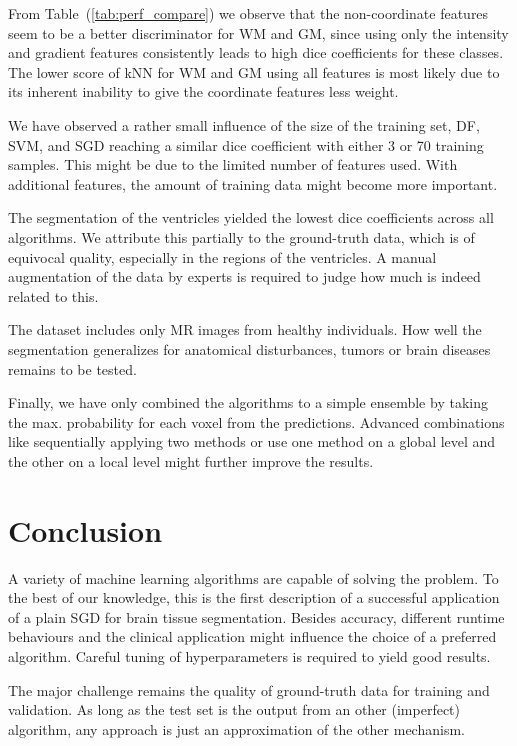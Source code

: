 \documentclass[journal]{IEEEtran}
\begin{document}
From Table~(\ref{tab:perf_compare}) we observe that the non-coordinate features seem to be a better discriminator for WM and GM, since using only the intensity and gradient features consistently leads to high dice coefficients for these classes. The lower score of kNN for WM and GM using all features is most likely due to its inherent inability to give the coordinate features less weight.

We have observed a rather small influence of the size of the training set, DF, SVM, and SGD reaching a similar dice coefficient with either 3 or 70 training samples. This might be due to the limited number of features used. With additional features, the amount of training data might become more important.

The segmentation of the ventricles yielded the lowest dice coefficients across all algorithms. We attribute this partially to the ground-truth data, which is of equivocal quality, especially in the regions of the ventricles. A manual augmentation of the data by experts is required to judge how much is indeed related to this.

The dataset includes only MR images from healthy individuals. How well the segmentation generalizes for anatomical disturbances, tumors or brain diseases remains to be tested.

Finally, we have only combined the algorithms to a simple ensemble by taking the max. probability for each voxel from the predictions. Advanced combinations like sequentially applying two methods or use one method on a global level and the other on a local level might further improve the results.

\section{Conclusion}
A variety of machine learning algorithms are capable of solving the problem. To the best of our knowledge, this is the first description of a successful application of a plain SGD for brain tissue segmentation. Besides accuracy, different runtime behaviours and the clinical application might influence the choice of a preferred algorithm. Careful tuning of hyperparameters is required to yield good results.

The major challenge remains the quality of ground-truth data for training and validation. As long as the test set is the output from an other (imperfect) algorithm, any approach is just an approximation of the other mechanism.
\end{document}
